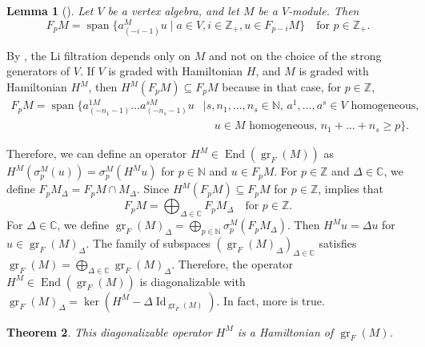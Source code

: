 \documentclass[a4paper, 12pt, reqno]{amsart}
\newtheorem{theorem}{Theorem}[section]
\newtheorem{lemma}[theorem]{Lemma}
\theoremstyle{remark}
\DeclareMathOperator{\Id}{Id}
\DeclareMathOperator{\gr}{gr}
\DeclareMathOperator{\End}{End}
\DeclareMathOperator{\vspan}{span}
\begin{document}
\begin{lemma}[{\cite[Lemma 2.9]{li_abelianizing_2005}}]
  \label{lmm:24}
  Let $V$ be a vertex algebra, and let $M$ be a $V$-module.
  Then
  \begin{equation*}
    F_pM = \vspan\{a^M_{(-i - 1)}u \mid a \in V, i \in \mathbb{Z}_+, u \in F_{p - i}M\} \quad \text{for $p \in \mathbb{Z}_+$}.
  \end{equation*}
\end{lemma}

By , the Li filtration depends only on $M$ and not on the choice of the strong generators of $V$.
If $V$ is graded with Hamiltonian $H$, and $M$ is graded with Hamiltonian $H^M$, then $H^M(F_pM) \subseteq F_pM$ because in that case, for $p \in \mathbb{Z}$,
\begin{equation*}
  \begin{split}
    F_pM = \vspan\{a^{1M}_{(-n_1 - 1)}\dots a^{sM}_{(-n_s - 1)}u &\mid \text{$s, n_1, \dots, n_s \in \mathbb{N}$, $a^1, \dots, a^s \in V$ homogeneous,} \\
                                                                 &\quad \text{$u \in M$ homogeneous, $n_1 + \dots + n_s \ge p$}\}.
  \end{split}
\end{equation*}

Therefore, we can define an operator $H^M \in \End(\gr_F(M))$ as $H^M(\sigma^M_p(u)) = \sigma^M_p(H^Mu)$ for $p \in \mathbb{N}$ and $u \in F_pM$.
For $p \in \mathbb{Z}$ and $\Delta \in \mathbb{C}$, we define $F_pM_{\Delta} = F_pM \cap M_{\Delta}$.
Since $H^M(F_pM) \subseteq F_pM$ for $p \in \mathbb{Z}$,  implies that
\begin{equation*}
  F_pM = \bigoplus_{\Delta \in \mathbb{C}}F_pM_{\Delta} \quad \text{for $p \in \mathbb{Z}$}.
\end{equation*}
For $\Delta \in \mathbb{C}$, we define $\gr_F(M)_{\Delta} = \bigoplus_{p \in \mathbb{N}}\sigma^M_p(F_pM_{\Delta})$.
Then $H^Mu = \Delta u$ for $u \in \gr_F(M)_{\Delta}$.
The family of subspaces $(\gr_F(M)_{\Delta})_{\Delta \in \mathbb{C}}$ satisfies $\gr_F(M) = \bigoplus_{\Delta \in \mathbb{C}}\gr_F(M)_{\Delta}$.
Therefore, the operator $H^M \in \End(\gr_F(M))$ is diagonalizable with $\gr_F(M)_{\Delta} = \ker(H^M - \Delta\Id_{\gr_F(M)})$.
In fact, more is true.

\begin{theorem}
  \label{thr:54}
  This diagonalizable operator $H^M$ is a Hamiltonian of $\gr_F(M)$.
\end{theorem}
\end{document}
